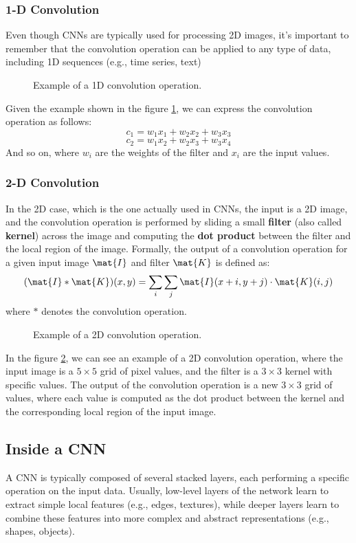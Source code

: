\subsubsection{1-D Convolution}
Even though CNNs are typically used for processing 2D images, it's important to remember that the convolution operation can be applied to any type of data, including 1D sequences (e.g., time series, text)
\begin{figure}[H]
    \centering
    
    \caption{Example of a 1D convolution operation.}
    \label{fig:1D-convolution}
\end{figure}
Given the example shown in the figure \ref{fig:1D-convolution}, we can express the convolution operation as follows:
$$ c_1 = w_1 x_1 + w_2 x_2 + w_3 x_3 $$
$$ c_2 = w_1 x_2 + w_2 x_3 + w_3 x_4 $$
And so on, where $w_i$ are the weights of the filter and $x_i$ are the input values.

\subsubsection{2-D Convolution}
In the 2D case, which is the one actually used in CNNs, the input is a 2D image, and the convolution operation is performed by 
sliding a small \textbf{filter} (also called \textbf{kernel}) across the image and computing the \textbf{dot product} between the filter and the local region of the image.
Formally, the output of a convolution operation for a given input image $\mat{I}$ and filter $\mat{K}$ is defined as:
$$ (\mat{I} * \mat{K})(x, y) = \sum_{i} \sum_{j} \mat{I}(x+i, y+j) \cdot \mat{K}(i, j) $$
where $ * $ denotes the convolution operation.

\begin{figure}[H]
    \centering
    
    \caption{Example of a 2D convolution operation.}
    \label{fig:2D-convolution}
\end{figure}
In the figure \ref{fig:2D-convolution}, we can see an example of a 2D convolution operation, where the input image is a $5 \times 5$ grid of pixel values, and the filter is a $3 \times 3$ kernel with specific values. 
The output of the convolution operation is a new $3 \times 3$ grid of values, where each value is computed as the dot product between the kernel and the corresponding local region of the input image.

\subsection{Inside a CNN}
A CNN is typically composed of several stacked layers, each performing a specific operation on the input data. 
Usually, low-level layers of the network learn to extract simple local features (e.g., edges, textures), while deeper layers learn to combine these features 
into more complex and abstract representations (e.g., shapes, objects).

